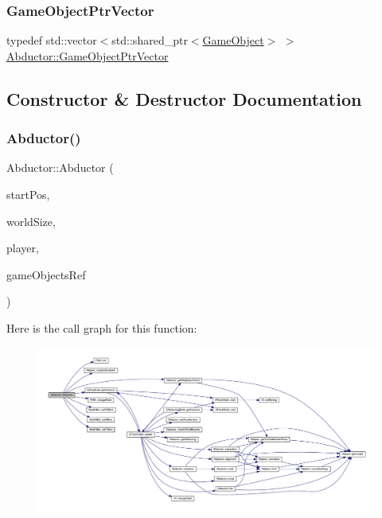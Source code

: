 \mbox{\label{class_abductor_a2fc54e0ab08037996dd212d4d2d0443f}} 
\subsubsection{\texorpdfstring{Game\+Object\+Ptr\+Vector}{GameObjectPtrVector}}
{\footnotesize\ttfamily typedef std\+::vector$<$std\+::shared\+\_\+ptr$<$\hyperlink{class_game_object}{Game\+Object}$>$ $>$ \hyperlink{class_abductor_a2fc54e0ab08037996dd212d4d2d0443f}{Abductor\+::\+Game\+Object\+Ptr\+Vector}}



\subsection{Constructor \& Destructor Documentation}
\mbox{\label{class_abductor_ac68525ef8d05680afbef24761e2baa8c}} 
\subsubsection{\texorpdfstring{Abductor()}{Abductor()}}
{\footnotesize\ttfamily Abductor\+::\+Abductor (\begin{DoxyParamCaption}\item[{const sf\+::\+Vector2f \&}]{start\+Pos,  }\item[{const sf\+::\+Vector2f \&}]{world\+Size,  }\item[{std\+::shared\+\_\+ptr$<$ \hyperlink{class_game_object}{Game\+Object} $>$}]{player,  }\item[{\hyperlink{class_abductor_a15ce0d62a23ac0c3e335874ff4286f5f}{Game\+Object\+Map} \&}]{game\+Objects\+Ref }\end{DoxyParamCaption})}

Here is the call graph for this function\+:
\nopagebreak
\begin{figure}[H]
\begin{center}
\leavevmode
\includegraphics[width=350pt]{class_abductor_ac68525ef8d05680afbef24761e2baa8c_cgraph}
\end{center}
\end{figure}


